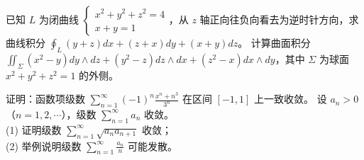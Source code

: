\documentclass[12pt,a4paper]{exampaper}
\begin{document}
\vspace{0.6em}

\begin{examquestions}[0pt]
  \examquestion 已知 $L$ 为闭曲线 $\begin{cases}x^2+y^2+z^2=4\\ x+y=1\end{cases}$，从 $z$ 轴正向往负向看去为逆时针方向，求曲线积分 $\oint_L (y+z)dx+(z+x)dy+(x+y)dz$。
  \examanswerspace{10cm}
  \examquestion 计算曲面积分 $\iint_\Sigma (x^2-y)dy\wedge dz+(y^2-z)dz\wedge dx+(z^2-x)dx\wedge dy$，其中 $\Sigma$ 为球面 $x^2+y^2+z^2=1$ 的外侧。
  \examanswerspace{10cm}
\end{examquestions}

\vspace{0.6em}

\begin{examquestions}[0pt]
  \examquestion 证明：函数项级数 $\sum_{n=1}^{\infty}(-1)^n\frac{x^n+n^3}{3^n}$ 在区间 $[-1,1]$ 上一致收敛。
  \examanswerspace{8cm}
  \examquestion 设 $a_n>0$（$n=1,2,\cdots$），级数 $\sum_{n=1}^{\infty}a_n$ 收敛。\\ (1) 证明级数 $\sum_{n=1}^{\infty}\sqrt{a_na_{n+1}}$ 收敛；\\ (2) 举例说明级数 $\sum_{n=1}^{\infty}\frac{a_n}{n}$ 可能发散。
  \examanswerspace{8cm}
\end{examquestions}
\end{document}
